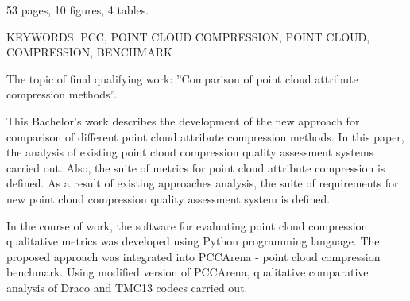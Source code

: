 53 pages, 10 figures, 4 tables.

KEYWORDS: PCC, POINT CLOUD COMPRESSION, POINT CLOUD, COMPRESSION, BENCHMARK

The topic of final qualifying work: ''Comparison of point cloud attribute
compression methods''.

This Bachelor's work describes the development of the new approach for
comparison of different point cloud attribute compression methods. In this
paper, the analysis of existing point cloud compression quality assessment
systems carried out. Also, the suite of metrics for point cloud attribute
compression is defined. As a result of existing approaches analysis, the suite
of requirements for new point cloud compression quality assessment system is
defined.

In the course of work, the software for evaluating point cloud compression
qualitative metrics was developed using Python programming language. The
proposed approach was integrated into PCCArena - point cloud compression
benchmark. Using modified version of PCCArena, qualitative comparative analysis
of Draco and TMC13 codecs carried out.